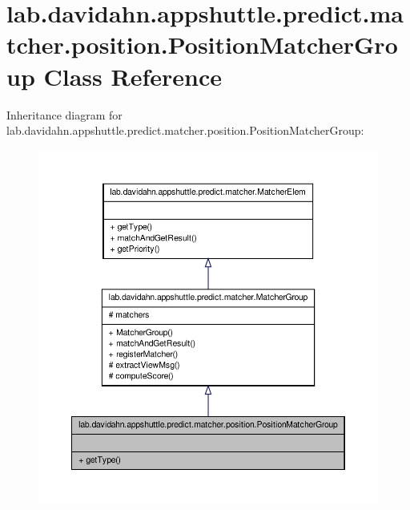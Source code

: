 \hypertarget{classlab_1_1davidahn_1_1appshuttle_1_1predict_1_1matcher_1_1position_1_1_position_matcher_group}{\section{lab.\-davidahn.\-appshuttle.\-predict.\-matcher.\-position.\-Position\-Matcher\-Group \-Class \-Reference}
\label{classlab_1_1davidahn_1_1appshuttle_1_1predict_1_1matcher_1_1position_1_1_position_matcher_group}
}


\-Inheritance diagram for lab.\-davidahn.\-appshuttle.\-predict.\-matcher.\-position.\-Position\-Matcher\-Group\-:
\nopagebreak
\begin{figure}[H]
\begin{center}
\leavevmode
\includegraphics[width=350pt]{classlab_1_1davidahn_1_1appshuttle_1_1predict_1_1matcher_1_1position_1_1_position_matcher_group__inherit__graph}
\end{center}
\end{figure}


